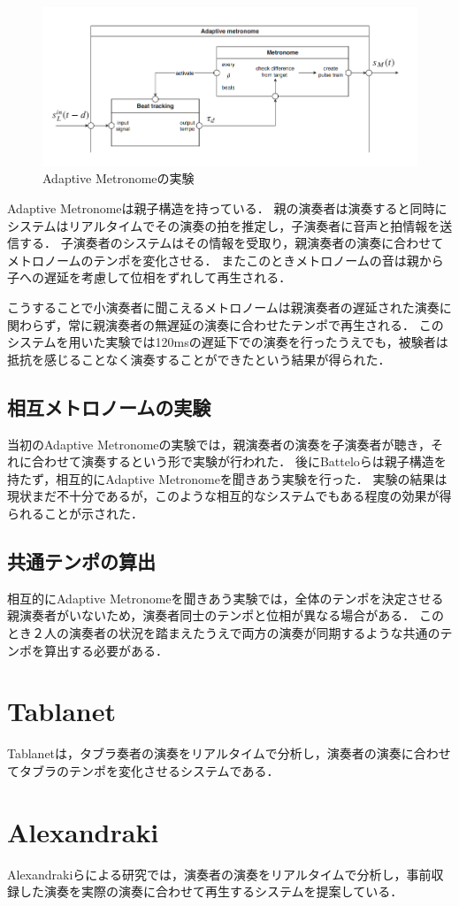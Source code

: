\begin{figure}[htbp]
  \centering
  \includegraphics[width=0.8\linewidth]{src/admet.png}
  \caption{Adaptive Metronomeの実験\cite{admet}}
  \label{fig:admet}
\end{figure}

Adaptive Metronomeは親子構造を持っている．
親の演奏者は演奏すると同時にシステムはリアルタイムでその演奏の拍を推定し，子演奏者に音声と拍情報を送信する．
子演奏者のシステムはその情報を受取り，親演奏者の演奏に合わせてメトロノームのテンポを変化させる．
またこのときメトロノームの音は親から子への遅延を考慮して位相をずれして再生される．

こうすることで小演奏者に聞こえるメトロノームは親演奏者の遅延された演奏に関わらず，常に親演奏者の無遅延の演奏に合わせたテンポで再生される．
このシステムを用いた実験では120msの遅延下での演奏を行ったうえでも，被験者は抵抗を感じることなく演奏することができたという結果が得られた．\cite{admet}

\subsection{相互メトロノームの実験}
当初のAdaptive Metronomeの実験では，親演奏者の演奏を子演奏者が聴き，それに合わせて演奏するという形で実験が行われた．
後にBatteloらは親子構造を持たず，相互的にAdaptive Metronomeを聞きあう実験を行った．
実験の結果は現状まだ不十分であるが，このような相互的なシステムでもある程度の効果が得られることが示された．

\subsection{共通テンポの算出}
相互的にAdaptive Metronomeを聞きあう実験では，全体のテンポを決定させる親演奏者がいないため，演奏者同士のテンポと位相が異なる場合がある．
このとき２人の演奏者の状況を踏まえたうえで両方の演奏が同期するような共通のテンポを算出する必要がある．


\section{Tablanet}
Tablanet\cite{tablanet}は，タブラ奏者の演奏をリアルタイムで分析し，演奏者の演奏に合わせてタブラのテンポを変化させるシステムである．

\section{Alexandraki}
Alexandrakiらによる研究\cite{alexandraki:2013}\cite{alexandraki:2014}では，演奏者の演奏をリアルタイムで分析し，事前収録した演奏を実際の演奏に合わせて再生するシステムを提案している．
